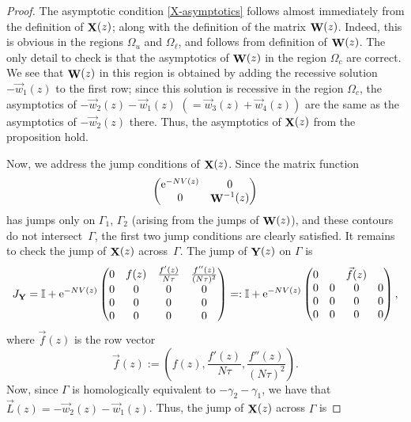 \documentclass[10pt,a4paper]{amsart}
\DeclareMathOperator{\YY}{{\bf Y}}
\DeclareMathOperator{\XX}{{\bf X}}
\DeclareMathOperator{\WW}{{\bf W}}
\numberwithin{equation}{section}
\begin{document}
\begin{proof}
 The asymptotic condition \eqref{X-asymptotics} follows almost immediately from the definition of $\XX(z)$; along with the definition of the matrix $\WW(z)$. Indeed, this is obvious in the regions $\Omega_u$ and $\Omega_\ell$, and follows from definition of $\WW(z)$. The only detail to check
 is that the asymptotics of $\WW(z)$ in the region $\Omega_c$ are correct. We see that $\WW(z)$ in this region is obtained by adding the recessive solution $-\vec{w}_1(z)$
 to the first row; since this solution is recessive in the region $\Omega_c$, the asymptotics of $-\vec{w}_2(z) - \vec{w}_1(z)$ $(= \vec{w}_3(z)+ \vec{w}_4(z))$ are the same as the
 asymptotics of $-\vec{w}_2(z)$ there. Thus, the asymptotics of $\XX(z)$ from the
 proposition hold.

 Now, we address the jump conditions of $\XX(z)$. Since the matrix function
 \begin{equation*}
 \begin{pmatrix}
 {\rm e}^{-NV(z)} & 0 \\
 0 & \WW^{-1}(z)
 \end{pmatrix}
 \end{equation*}
 has jumps only on $\Gamma_1$, $\Gamma_2$ (arising from the jumps of $\WW(z)$), and these contours do not intersect~$\Gamma$, the first two jump conditions are clearly satisfied. It remains to check the jump of $\XX(z)$ across~$\Gamma$. The jump of $\YY(z)$ on $\Gamma$ is
 \begin{equation*}
 J_{\YY} = \mathbb{I} +
 {\rm e}^{-NV(z)}\begin{pmatrix}
 0 & f(z) & \frac{f'(z)}{N\tau} & \frac{f''(z)}{(N\tau)^2} \\
 0 & 0 & 0 & 0 \\
 0 & 0 & 0 & 0 \\
 0 & 0 & 0 & 0
 \end{pmatrix}
 =:
 \mathbb{I} + {\rm e}^{-NV(z)} \begin{pmatrix}
 0 & & \vec{f}(z) & \\
 0 & 0 & 0 & 0 \\
 0 & 0 & 0 & 0 \\
 0 & 0 & 0 & 0
 \end{pmatrix},
 \end{equation*}
 where $\vec{f}(z)$ is the row vector
 \begin{equation*}
 \vec{f}(z) := \left(
 f(z), \frac{f'(z)}{N\tau}, \frac{f''(z)}{(N\tau)^2} \right).
 \end{equation*}
 Now, since $\Gamma$ is homologically equivalent to $-\gamma_2 - \gamma_1$, we have that $\vec{L}(z) = -\vec{w}_2(z) - \vec{w}_1(z)$. Thus, the jump of $\XX(z)$ across $\Gamma$ is

\end{proof}
\end{document}

